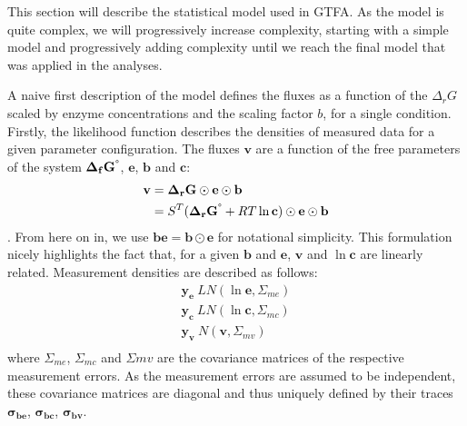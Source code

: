 \documentclass[10pt,letterpaper]{article}
\newcommand{\sdgf}{\Delta_fG^{\degree}}
\newcommand{\dgr}{\Delta_rG}
\newcommand{\sdgr}{\Delta_rG^{\degree}}
\newcommand{\bsdgf}{\mathbf{\sdgf}}
\newcommand{\bdgr}{\mathbf{\dgr}}
\newcommand{\bsdgr}{\mathbf{\sdgr}}
\newcommand{\be}{\mathbf{e}}
\newcommand{\bc}{\mathbf{c}}
\newcommand{\bb}{\mathbf{b}}
\newcommand{\bv}{\mathbf{v}}
\newcommand{\bbe}{\mathbf{be}}
\begin{document}
This section will describe the statistical model used in GTFA.
As the model is quite complex, we will progressively increase complexity, starting with a simple model and progressively adding complexity until we reach the final model that was applied in the analyses.

A naive first description of the model defines the fluxes as a function of the $\dgr$ scaled by enzyme concentrations and the scaling factor $b$, for a single condition.
Firstly, the likelihood function describes the densities of measured data for a given parameter configuration.
The fluxes $\bv$ are a function of the free parameters of the system $\bsdgf$, $\be$, $\bb$ and $\bc$:
\begin{align}
    \bv &= \bdgr \odot \be \odot \bb \\
        &= S^T (\bsdgr + RT\ln{\bc}) \odot \be \odot \bb \\
\end{align}
.
From here on in, we use $\bbe=\bb \odot \be$ for notational simplicity.
This formulation nicely highlights the fact that, for a given $\bb$ and $\be$, $\bv$ and $\ln{\mathbf{c}}$ are linearly related.
Measurement densities are described as follows:
\begin{align*}
    \mathbf{y_{e}} ~ LN(\ln{\be}, \Sigma_{me}) \\
    \mathbf{y_{c}} ~ LN(\ln{\bc}, \Sigma_{mc}) \\
    \mathbf{y_{v}} ~ N(\bv, \Sigma_{mv}) \\
\end{align*}
where $\Sigma_{me}$, $\Sigma_{mc}$ and $\Sigma{mv}$ are the covariance matrices of the respective measurement errors.
As the measurement errors are assumed to be independent, these covariance matrices are diagonal and thus uniquely defined by their traces $\mathbf{\sigma_{be}}$, $\mathbf{\sigma_{bc}}$, $\mathbf{\sigma_{bv}}$.
\end{document}

